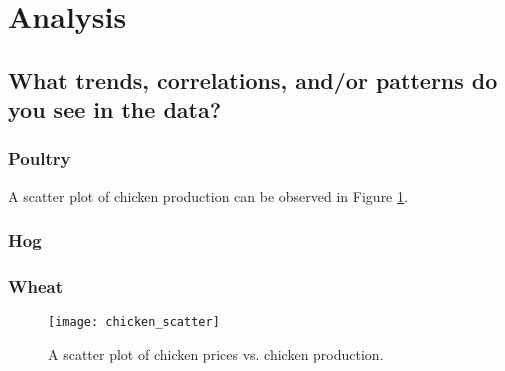 \section{Analysis}

\subsection{What trends, correlations, and/or patterns do you see in the data?}

\subsubsection{Poultry}

A scatter plot of chicken production can be observed in Figure \ref{fig:chicken_scatter}.

\subsubsection{Hog}

\subsubsection{Wheat}



\begin{figure}
    \texttt{[image: chicken\_scatter]}
    \caption{A scatter plot of chicken prices vs. chicken production.}
    \label{fig:chicken_scatter}
\end{figure}